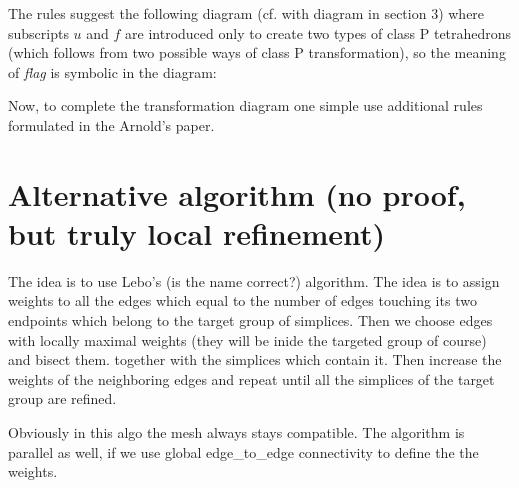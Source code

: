 \documentclass[a4paper,12pt]{amsart}
\numberwithin{equation}{section}
\begin{document}
The rules suggest the following diagram (cf. with diagram in section 3) where subscripts $u$ and $f$ are introduced only to create two types of class P tetrahedrons (which follows from two possible ways of class P transformation), so the meaning of \textit{flag} is symbolic in the diagram:

\begin{center}
\end{center}

Now, to complete the transformation diagram one simple use additional rules formulated in the Arnold's paper.

\section{Alternative algorithm (no proof, but truly local refinement)}
The idea is to use Lebo's (is the name correct?) algorithm. The idea is to assign weights to all the edges which equal to the number of edges touching its two endpoints which belong to the target group of simplices.
Then we choose edges with locally maximal weights (they will be inide the targeted group of course) and bisect them. together with the simplices which contain it.
Then increase the weights of the neighboring edges and repeat until all the simplices of the target group are refined.

Obviously in this algo the mesh always stays compatible. The algorithm is parallel as well, if we use global edge_to_edge connectivity to define the the weights.
\end{document}
